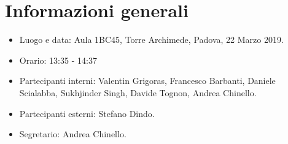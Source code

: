 \section{Informazioni generali}
\begin{itemize}
    \item Luogo e data: Aula 1BC45, Torre Archimede, Padova, 22 Marzo 2019.
    \item Orario: 13:35 - 14:37
    \item Partecipanti interni: Valentin Grigoras, Francesco Barbanti, Daniele Scialabba, Sukhjinder Singh, Davide Tognon, Andrea Chinello.
    \item Partecipanti esterni: Stefano Dindo.
    \item Segretario: Andrea Chinello.
\end{itemize}